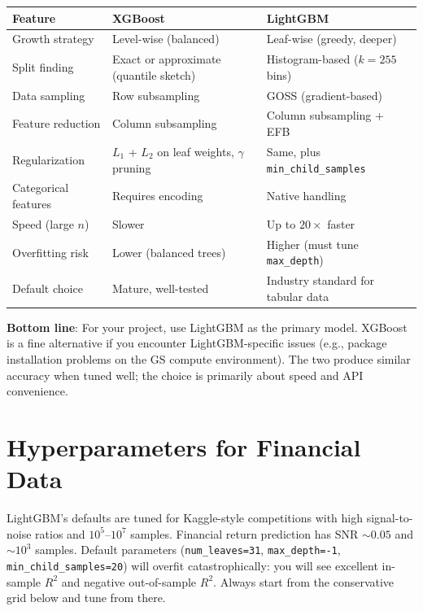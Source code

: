 \begin{center}
\begin{tabular}{p{4.2cm} p{5cm} p{5cm}}
\toprule
\textbf{Feature} & \textbf{XGBoost} & \textbf{LightGBM} \\
\midrule
Growth strategy & Level-wise (balanced) & Leaf-wise (greedy, deeper) \\[4pt]
Split finding & Exact or approximate (quantile sketch) & Histogram-based ($k{=}255$ bins) \\[4pt]
Data sampling & Row subsampling & GOSS (gradient-based) \\[4pt]
Feature reduction & Column subsampling & Column subsampling + EFB \\[4pt]
Regularization & $L_1$ + $L_2$ on leaf weights, $\gamma$ pruning & Same, plus \texttt{min\_child\_samples} \\[4pt]
Categorical features & Requires encoding & Native handling \\[4pt]
Speed (large $n$) & Slower & Up to $20\times$ faster \\[4pt]
Overfitting risk & Lower (balanced trees) & Higher (must tune \texttt{max\_depth}) \\[4pt]
Default choice & Mature, well-tested & Industry standard for tabular data \\
\bottomrule
\end{tabular}
\end{center}

\medskip
\noindent\textbf{Bottom line}: For your project, use LightGBM as the primary model.
XGBoost is a fine alternative if you encounter LightGBM-specific issues (e.g., package installation problems on the GS compute environment).
The two produce similar accuracy when tuned well; the choice is primarily about speed and API convenience.

\section{Hyperparameters for Financial Data}
\label{sec:hyperparams-finance}

\begin{warning}
LightGBM's defaults are tuned for Kaggle-style competitions with high signal-to-noise ratios and $10^5$--$10^7$ samples.
Financial return prediction has SNR $\sim 0.05$ and $\sim 10^3$ samples.
Default parameters (\texttt{num\_leaves=31}, \texttt{max\_depth=-1}, \texttt{min\_child\_samples=20}) will overfit catastrophically: you will see excellent in-sample $R^2$ and negative out-of-sample $R^2$.
Always start from the conservative grid below and tune from there.
\end{warning}

